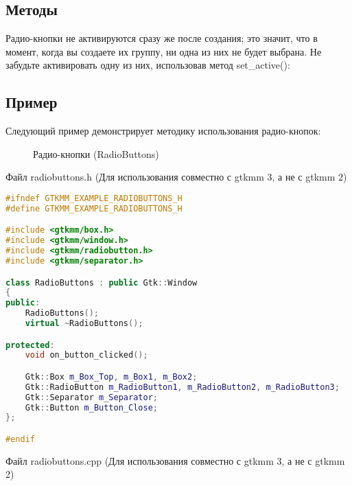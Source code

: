 \subsection{Методы}
Радио-кнопки не активируются сразу же после создания; это значит, что в момент, когда вы создаете их группу, ни одна из них не будет выбрана. Не забудьте активировать одну из них, использовав метод set\_active(): 
\subsection{Пример}
Следующий пример демонстрирует методику использования радио-кнопок: 
\begin{figure}[h]
	\center{\texttt{[image: 53]}}
	\caption{Радио-кнопки (RadioButtons)}
	\label{ris:image2}
\end{figure}
Файл radiobuttons.h (Для использования совместно с gtkmm 3, а не с gtkmm 2) 
\begin{lstlisting}[language=C++]
#ifndef GTKMM_EXAMPLE_RADIOBUTTONS_H
#define GTKMM_EXAMPLE_RADIOBUTTONS_H

#include <gtkmm/box.h>
#include <gtkmm/window.h>
#include <gtkmm/radiobutton.h>
#include <gtkmm/separator.h>

class RadioButtons : public Gtk::Window
{
public:
	RadioButtons();
	virtual ~RadioButtons();

protected:
	void on_button_clicked();

	Gtk::Box m_Box_Top, m_Box1, m_Box2;
	Gtk::RadioButton m_RadioButton1, m_RadioButton2, m_RadioButton3;
	Gtk::Separator m_Separator;
	Gtk::Button m_Button_Close;
};

#endif 

\end{lstlisting}
Файл radiobuttons.cpp (Для использования совместно с gtkmm 3, а не с gtkmm 2) 

